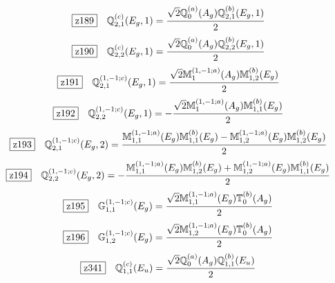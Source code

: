\documentclass[fleqn,10pt,landscape]{jsarticle}
\begin{document}
\begin{dmath*}
\hspace*{3mm}\fbox{z189}\quad \mathbb{Q}_{2,1}^{(c)}(E_{g},1)=\frac{\sqrt{2} \mathbb{Q}_{0}^{(a)}(A_{g}) \mathbb{Q}_{2,1}^{(b)}(E_{g},1)}{2}
\end{dmath*}
\begin{dmath*}
\hspace*{3mm}\fbox{z190}\quad \mathbb{Q}_{2,2}^{(c)}(E_{g},1)=\frac{\sqrt{2} \mathbb{Q}_{0}^{(a)}(A_{g}) \mathbb{Q}_{2,2}^{(b)}(E_{g},1)}{2}
\end{dmath*}
\begin{dmath*}
\hspace*{3mm}\fbox{z191}\quad \mathbb{Q}_{2,1}^{(1,-1;c)}(E_{g},1)=\frac{\sqrt{2} \mathbb{M}_{1}^{(1,-1;a)}(A_{g}) \mathbb{M}_{1,2}^{(b)}(E_{g})}{2}
\end{dmath*}
\begin{dmath*}
\hspace*{3mm}\fbox{z192}\quad \mathbb{Q}_{2,2}^{(1,-1;c)}(E_{g},1)=- \frac{\sqrt{2} \mathbb{M}_{1}^{(1,-1;a)}(A_{g}) \mathbb{M}_{1,1}^{(b)}(E_{g})}{2}
\end{dmath*}
\begin{dmath*}
\hspace*{3mm}\fbox{z193}\quad \mathbb{Q}_{2,1}^{(1,-1;c)}(E_{g},2)=\frac{\mathbb{M}_{1,1}^{(1,-1;a)}(E_{g}) \mathbb{M}_{1,1}^{(b)}(E_{g}) - \mathbb{M}_{1,2}^{(1,-1;a)}(E_{g}) \mathbb{M}_{1,2}^{(b)}(E_{g})}{2}
\end{dmath*}
\begin{dmath*}
\hspace*{3mm}\fbox{z194}\quad \mathbb{Q}_{2,2}^{(1,-1;c)}(E_{g},2)=- \frac{\mathbb{M}_{1,1}^{(1,-1;a)}(E_{g}) \mathbb{M}_{1,2}^{(b)}(E_{g}) + \mathbb{M}_{1,2}^{(1,-1;a)}(E_{g}) \mathbb{M}_{1,1}^{(b)}(E_{g})}{2}
\end{dmath*}
\begin{dmath*}
\hspace*{3mm}\fbox{z195}\quad \mathbb{G}_{1,1}^{(1,-1;c)}(E_{g})=\frac{\sqrt{2} \mathbb{M}_{1,1}^{(1,-1;a)}(E_{g}) \mathbb{T}_{0}^{(b)}(A_{g})}{2}
\end{dmath*}
\begin{dmath*}
\hspace*{3mm}\fbox{z196}\quad \mathbb{G}_{1,2}^{(1,-1;c)}(E_{g})=\frac{\sqrt{2} \mathbb{M}_{1,2}^{(1,-1;a)}(E_{g}) \mathbb{T}_{0}^{(b)}(A_{g})}{2}
\end{dmath*}
\begin{dmath*}
\hspace*{3mm}\fbox{z341}\quad \mathbb{Q}_{1,1}^{(c)}(E_{u})=\frac{\sqrt{2} \mathbb{Q}_{0}^{(a)}(A_{g}) \mathbb{Q}_{1,1}^{(b)}(E_{u})}{2}
\end{dmath*}
\end{document}
